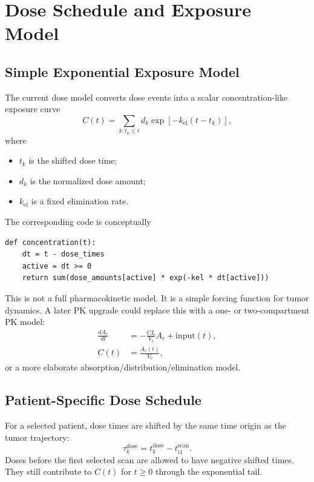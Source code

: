 \documentclass[11pt,a4paper]{article}
\begin{document}
\section{Dose Schedule and Exposure Model}

\subsection{Simple Exponential Exposure Model}

The current dose model converts dose events into a scalar concentration-like exposure curve
\[
    C(t)
    = \sum_{k: t_k \leq t} d_k \exp[-k_{\mathrm{el}}(t-t_k)],
\]
where
\begin{itemize}[leftmargin=2em]
    \item $t_k$ is the shifted dose time;
    \item $d_k$ is the normalized dose amount;
    \item $k_{\mathrm{el}}$ is a fixed elimination rate.
\end{itemize}

The corresponding code is conceptually
\begin{lstlisting}
def concentration(t):
    dt = t - dose_times
    active = dt >= 0
    return sum(dose_amounts[active] * exp(-kel * dt[active]))
\end{lstlisting}

This is not a full pharmacokinetic model. It is a simple forcing function for tumor dynamics. A later PK upgrade could replace this with a one- or two-compartment PK model:
\[
\begin{aligned}
    \frac{dA_c}{dt} &= -\frac{CL}{V_c} A_c + \text{input}(t),\\
    C(t) &= \frac{A_c(t)}{V_c},
\end{aligned}
\]
or a more elaborate absorption/distribution/elimination model.

\subsection{Patient-Specific Dose Schedule}

For a selected patient, dose times are shifted by the same time origin as the tumor trajectory:
\[
    \tau_k^{\mathrm{dose} }
    = t_k^{\mathrm{dose}} - t_{i1}^{\mathrm{scan}}.
\]
Doses before the first selected scan are allowed to have negative shifted times. They still contribute to $C(t)$ for $t\geq 0$ through the exponential tail.
\end{document}
